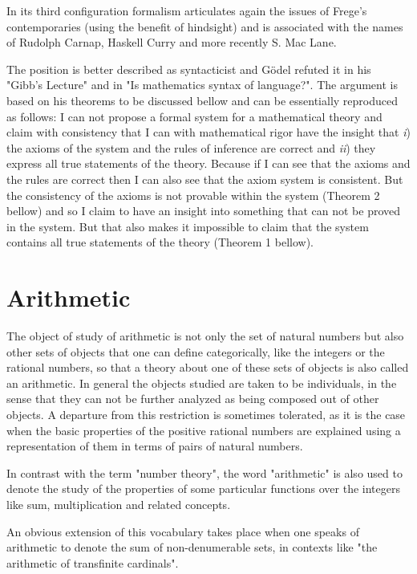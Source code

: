 \documentclass[12pt]{article}
\begin{document}
In its third configuration formalism articulates again the issues of Frege's contemporaries (using the benefit of hindsight) and is associated with the names of Rudolph Carnap, Haskell Curry and more recently S. Mac Lane.

The position is better described as syntacticist and G\"{o}del refuted it in his "Gibb's Lecture" and in "Is mathematics syntax of language?". The argument is based on his theorems to be discussed bellow and can be essentially reproduced as follows: I can not propose a formal system for a mathematical theory and claim with consistency that I can with mathematical rigor have the insight that \emph{i}) the axioms of the system and the rules of inference are correct and \emph{ii}) they express all true statements of the theory. Because if I can see that the axioms and the rules are correct then I can also see that the axiom system is consistent. But the consistency of the axioms is not provable within the system (Theorem 2 bellow) and so I claim to have an insight into something that can not be proved in the system. But that also makes it impossible to claim that the system contains all true statements of the theory (Theorem 1 bellow).

\section{Arithmetic}\normalsize

The object of study of arithmetic is not only the set of natural numbers but also other sets of objects that one can define categorically, like the integers or the rational numbers, so that a theory about one of these sets of objects is also called an arithmetic. In general the objects studied are taken to be individuals, in the sense that they can not be further analyzed as being composed out of other objects. A departure from this restriction is sometimes tolerated, as it is the case when the basic properties of the positive rational numbers are explained using a representation of them in terms of pairs of natural numbers.

In contrast with the term "number theory", the word "arithmetic" is also used to denote the study of the properties of some particular functions over the integers like sum, multiplication and related concepts.

An obvious extension of this vocabulary takes place when one speaks of arithmetic to denote the sum of non-denumerable sets, in contexts like "the arithmetic of transfinite cardinals".                                         
\end{document}
